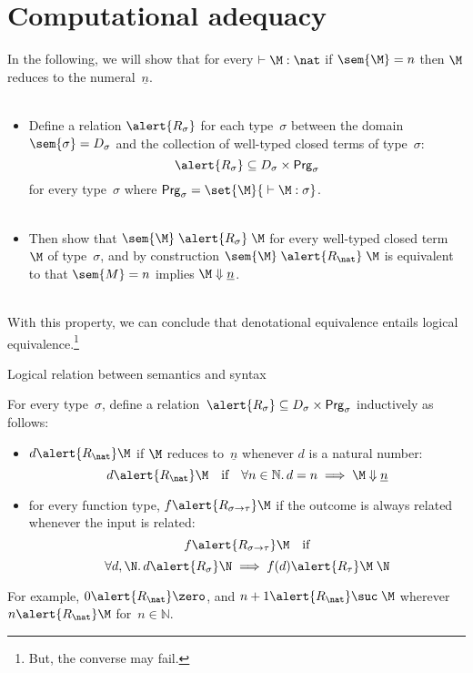 \section{Computational adequacy}
\begin{frame}
  In the following, we will show that for every $\vdash \M : \nat$ if
  $\sem{\M} = n$ then $\M$ reduces to the numeral~$\underline{n}$.
  \\~\\
  \begin{itemize}
    \item Define a relation $\alert{R_\sigma}$ for each type~$\sigma$ between
      the domain~$\sem{\sigma} = D_\sigma$ and the collection of
      well-typed closed terms of type~$\sigma$:
      \[
        \alert{R_{\sigma}} \subseteq D_\sigma \times \mathsf{Prg}_\sigma
      \]
      for every type~$\sigma$ where $\mathsf{Prg}_\sigma = \set{ \M }{{}\vdash
        \M : \sigma}$.
      \\~\\
    \item Then show that $\sem{\M}\mathrel{\alert{R_\sigma}} \M$ for every
      well-typed closed term~$\M$ of type~$\sigma$, and by construction
      $\sem{\M} \mathrel{\alert{R_\nat}} \M$ is equivalent to that
      $\sem{M} = n$ implies $\M \Downarrow \underline{n}$. 
  \end{itemize}
  ~\\

  With this property, we can conclude that denotational equivalence entails
  logical equivalence.\footnote{
    But, the converse may fail. 
  }
\end{frame}
\begin{frame}{Logical relation between semantics and syntax}
\begin{definition}
  For every type~$\sigma$, define a relation~$\alert{R_\sigma} \subseteq
  D_\sigma \times \mathsf{Prg}_\sigma$ inductively as follows:
  \begin{itemize}
    \item $d \alert{\mathrel{R_\nat}}\M$
      if $\M$ reduces to~$\underline{n}$
      whenever $d$ is a natural number:
      \[
        d \alert{\mathrel{R_\nat}} \M
        \quad\text{if}\quad \forall n \in \mathbb{N}.\,
        d = n \implies \M \Downarrow \underline{n}
      \]
    \item for every function type, $f \alert{\mathrel{R_{\sigma\to\tau}}} \M$
      if the outcome is always related whenever the input is related:
      \[
        f \alert{\mathrel{R_{\sigma\to\tau}}} \M
        \quad\text{if}
      \]
      \[
        \forall d, 
        \N.\, 
        d \alert{\mathrel{R}_\sigma} \N \implies f(d) \alert{\mathrel{R_\tau}} \M\;\N
      \]
  \end{itemize}
\end{definition}
For example, $0 \alert{\mathrel{R_\nat}} \zero$, and
$n + 1 \alert{\mathrel{R_\nat}}
\suc\;\M$ wherever $n \alert{\mathrel{R_\nat}} \M$ for~$n \in \mathbb{N}$. 

\end{frame}
